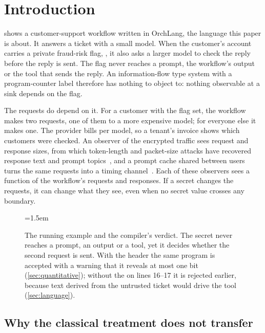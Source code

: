 \section{Introduction}\label{sec:intro}

 shows a customer-support workflow written in OrchLang, the
language this paper is about. It answers a ticket with a small model. When the
customer's account carries a private fraud-risk flag, , it also
asks a larger model to check the reply before the reply is sent. The flag never
reaches a prompt, the workflow's output or the tool that sends the reply. An
information-flow type system with a program-counter label therefore has nothing
to object to: nothing observable at a sink depends on the flag.

The requests do depend on it. For a customer with the flag set, the workflow makes
two requests, one of them to a more expensive model; for everyone else it makes
one. The provider bills per model, so a tenant's invoice shows which customers
were checked. An observer of the encrypted traffic sees request and response
sizes, from which token-length and packet-size attacks have recovered response
text and prompt topics~\cite{weiss2024what,mcdonald2025whisper}, and a
prompt cache shared between users turns the same requests into a timing
channel~\cite{gu2025auditing}. Each of these observers sees a function of the
workflow's requests and responses. If a secret changes the requests, it can change
what they see, even when no secret value crosses any boundary.

\begin{figure}[t]

\vspace{-2pt}
{\scriptsize\ttfamily\raggedright\hangindent=1.5em\par}
\caption{The running example and the compiler's verdict. The secret  never
reaches a prompt, an output or a tool, yet it decides whether the second request is sent.
With the header  the same program is accepted
with a warning that it reveals at most one bit (\cref{sec:quantitative}); without the
 on lines 16--17 it is rejected earlier, because text derived from the untrusted
ticket would drive the tool (\cref{sec:language}).}
\label{fig:triage}
\end{figure}

\subsection{Why the classical treatment does not transfer}\label{sec:intro-classical}


